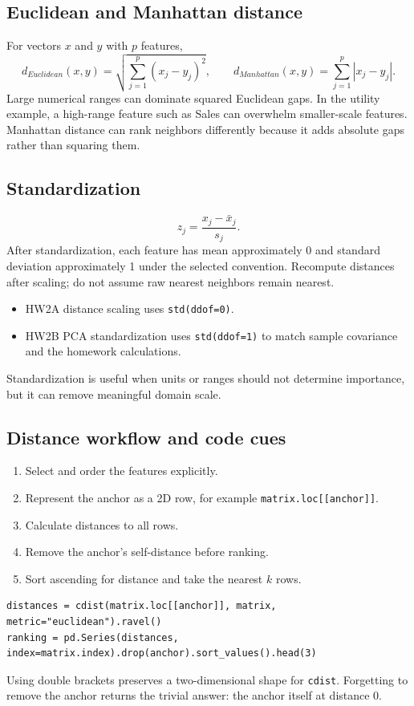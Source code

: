 \documentclass[11pt]{article}
\begin{document}
\subsection{Euclidean and Manhattan distance}
For vectors $x$ and $y$ with $p$ features,
\[
d_{Euclidean}(x,y)=\sqrt{\sum_{j=1}^{p}(x_j-y_j)^2},
\qquad
d_{Manhattan}(x,y)=\sum_{j=1}^{p}|x_j-y_j|.
\]
Large numerical ranges can dominate squared Euclidean gaps. In the utility example, a high-range feature such as Sales can overwhelm smaller-scale features. Manhattan distance can rank neighbors differently because it adds absolute gaps rather than squaring them.

\subsection{Standardization}
\[
z_j = \frac{x_j-\bar{x}_j}{s_j}.
\]
After standardization, each feature has mean approximately 0 and standard deviation approximately 1 under the selected convention. Recompute distances after scaling; do not assume raw nearest neighbors remain nearest.
\begin{itemize}
	\item HW2A distance scaling uses \texttt{std(ddof=0)}.
	\item HW2B PCA standardization uses \texttt{std(ddof=1)} to match sample covariance and the homework calculations.
\end{itemize}
Standardization is useful when units or ranges should not determine importance, but it can remove meaningful domain scale.

\subsection{Distance workflow and code cues}
\begin{enumerate}
	\item Select and order the features explicitly.
	\item Represent the anchor as a 2D row, for example \texttt{matrix.loc[[anchor]]}.
	\item Calculate distances to all rows.
	\item Remove the anchor's self-distance before ranking.
	\item Sort ascending for distance and take the nearest $k$ rows.
\end{enumerate}
\begin{lstlisting}
distances = cdist(matrix.loc[[anchor]], matrix, metric="euclidean").ravel()
ranking = pd.Series(distances, index=matrix.index).drop(anchor).sort_values().head(3)
\end{lstlisting}
Using double brackets preserves a two-dimensional shape for \texttt{cdist}. Forgetting to remove the anchor returns the trivial answer: the anchor itself at distance 0.
\end{document}
